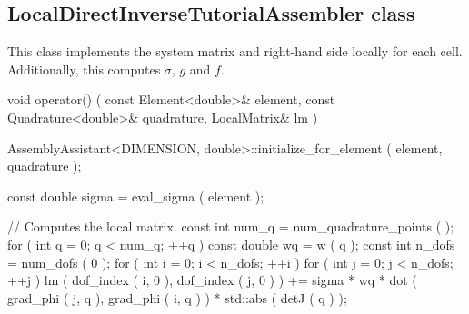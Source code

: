 \documentclass[a4paper, 11pt, twoside]{article}
\begin{document}
\subsection{LocalDirectInverseTutorialAssembler class}
This class implements the system matrix and right-hand side locally for each cell. Additionally, this computes $\sigma$, $g$ and $f$.

\begin{code}
class LocalDirectInverseTutorialAssembler : private AssemblyAssistant<DIMENSION, 
                                                                      double>
{
  public:
\end{code} 
  \begin{code}[caption={Computes local stiffness matrix $A$. \eqref{eq:finiteelement}}, label=sc:stiffness]
    void operator() ( const Element<double>& element, 
                      const Quadrature<double>& quadrature,
                      LocalMatrix& lm )
    {
        AssemblyAssistant<DIMENSION, double>::initialize_for_element ( element, 
                                                                     quadrature );

        const double sigma = eval_sigma ( element );

        // Computes the local matrix.
        const int num_q = num_quadrature_points ( );
        for ( int q = 0; q < num_q; ++q )
        {
            const double wq = w ( q );
            const int n_dofs = num_dofs ( 0 );
            for ( int i = 0; i < n_dofs; ++i )
            {
                for ( int j = 0; j < n_dofs; ++j )
                {
                    lm ( dof_index ( i, 0 ), dof_index ( j, 0 ) ) +=
                          sigma * wq * dot ( grad_phi ( j, q ), grad_phi ( i, q ) ) * 
                          std::abs ( detJ ( q ) );
                }
            }
        }
    }
    \end{code}
\end{document}
